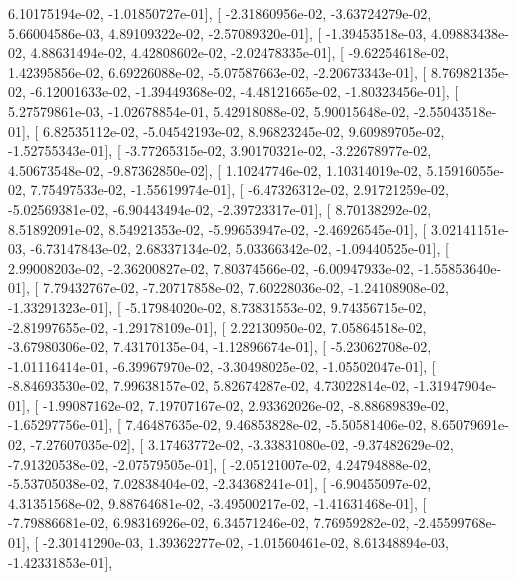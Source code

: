 \documentclass{article}
\begin{document}
          6.10175194e-02,  -1.01850727e-01],
       [ -2.31860956e-02,  -3.63724279e-02,   5.66004586e-03,
          4.89109322e-02,  -2.57089320e-01],
       [ -1.39453518e-03,   4.09883438e-02,   4.88631494e-02,
          4.42808602e-02,  -2.02478335e-01],
       [ -9.62254618e-02,   1.42395856e-02,   6.69226088e-02,
         -5.07587663e-02,  -2.20673343e-01],
       [  8.76982135e-02,  -6.12001633e-02,  -1.39449368e-02,
         -4.48121665e-02,  -1.80323456e-01],
       [  5.27579861e-03,  -1.02678854e-01,   5.42918088e-02,
          5.90015648e-02,  -2.55043518e-01],
       [  6.82535112e-02,  -5.04542193e-02,   8.96823245e-02,
          9.60989705e-02,  -1.52755343e-01],
       [ -3.77265315e-02,   3.90170321e-02,  -3.22678977e-02,
          4.50673548e-02,  -9.87362850e-02],
       [  1.10247746e-02,   1.10314019e-02,   5.15916055e-02,
          7.75497533e-02,  -1.55619974e-01],
       [ -6.47326312e-02,   2.91721259e-02,  -5.02569381e-02,
         -6.90443494e-02,  -2.39723317e-01],
       [  8.70138292e-02,   8.51892091e-02,   8.54921353e-02,
         -5.99653947e-02,  -2.46926545e-01],
       [  3.02141151e-03,  -6.73147843e-02,   2.68337134e-02,
          5.03366342e-02,  -1.09440525e-01],
       [  2.99008203e-02,  -2.36200827e-02,   7.80374566e-02,
         -6.00947933e-02,  -1.55853640e-01],
       [  7.79432767e-02,  -7.20717858e-02,   7.60228036e-02,
         -1.24108908e-02,  -1.33291323e-01],
       [ -5.17984020e-02,   8.73831553e-02,   9.74356715e-02,
         -2.81997655e-02,  -1.29178109e-01],
       [  2.22130950e-02,   7.05864518e-02,  -3.67980306e-02,
          7.43170135e-04,  -1.12896674e-01],
       [ -5.23062708e-02,  -1.01116414e-01,  -6.39967970e-02,
         -3.30498025e-02,  -1.05502047e-01],
       [ -8.84693530e-02,   7.99638157e-02,   5.82674287e-02,
          4.73022814e-02,  -1.31947904e-01],
       [ -1.99087162e-02,   7.19707167e-02,   2.93362026e-02,
         -8.88689839e-02,  -1.65297756e-01],
       [  7.46487635e-02,   9.46853828e-02,  -5.50581406e-02,
          8.65079691e-02,  -7.27607035e-02],
       [  3.17463772e-02,  -3.33831080e-02,  -9.37482629e-02,
         -7.91320538e-02,  -2.07579505e-01],
       [ -2.05121007e-02,   4.24794888e-02,  -5.53705038e-02,
          7.02838404e-02,  -2.34368241e-01],
       [ -6.90455097e-02,   4.31351568e-02,   9.88764681e-02,
         -3.49500217e-02,  -1.41631468e-01],
       [ -7.79886681e-02,   6.98316926e-02,   6.34571246e-02,
          7.76959282e-02,  -2.45599768e-01],
       [ -2.30141290e-03,   1.39362277e-02,  -1.01560461e-02,
          8.61348894e-03,  -1.42331853e-01],
\end{document}
